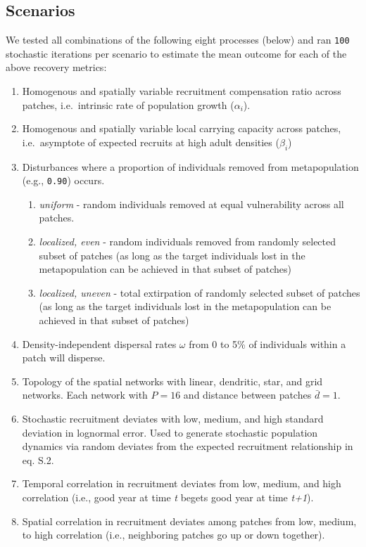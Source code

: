 \documentclass[
]{article}
\providecommand{\tightlist}{%
  \setlength{\itemsep}{0pt}\setlength{\parskip}{0pt}}
\begin{document}
\hypertarget{scenarios}{%
\subsection{Scenarios}\label{scenarios}}

We tested all combinations of the following eight processes (below) and
ran \texttt{100} stochastic iterations per scenario to estimate the mean
outcome for each of the above recovery metrics:

\begin{enumerate}
\def\labelenumi{\arabic{enumi}.}
\item
  Homogenous and spatially variable recruitment compensation ratio
  across patches, i.e.~intrinsic rate of population growth
  (\(\alpha_i\)).
\item
  Homogenous and spatially variable local carrying capacity across
  patches, i.e.~asymptote of expected recruits at high adult densities
  (\(\beta_i\))
\item
  Disturbances where a proportion of individuals removed from
  metapopulation (e.g., \texttt{0.90}) occurs.

  \begin{enumerate}
  \def\labelenumii{\alph{enumii}.}
  \tightlist
  \item
    \emph{uniform} - random individuals removed at equal vulnerability
    across all patches.
  \item
    \emph{localized, even} - random individuals removed from randomly
    selected subset of patches (as long as the target individuals lost
    in the metapopulation can be achieved in that subset of patches)
  \item
    \emph{localized, uneven} - total extirpation of randomly selected
    subset of patches (as long as the target individuals lost in the
    metapopulation can be achieved in that subset of patches)
  \end{enumerate}
\item
  Density-independent dispersal rates \(\omega\) from 0 to 5\% of
  individuals within a patch will disperse.
\item
  Topology of the spatial networks with linear, dendritic, star, and
  grid networks. Each network with \(P=16\) and distance between patches
  \(\bar{d}=1\).
\item
  Stochastic recruitment deviates with low, medium, and high standard
  deviation in lognormal error. Used to generate stochastic population
  dynamics via random deviates from the expected recruitment
  relationship in eq. S.2.
\item
  Temporal correlation in recruitment deviates from low, medium, and
  high correlation (i.e., good year at time \emph{t} begets good year at
  time \emph{t+1}).
\item
  Spatial correlation in recruitment deviates among patches from low,
  medium, to high correlation (i.e., neighboring patches go up or down
  together).
\end{enumerate}
\end{document}
